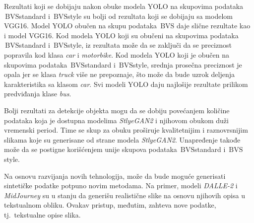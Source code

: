 \documentclass[12pt,oneside]{memoir}
\newcommand{\bvs}{\ensuremath{\,\textrm{BVS}}}
\begin{document}
Rezultati koji se dobijaju nakon obuke modela YOLO na skupovima podataka \bvs{standard} i \bvs{style} su bolji od rezultata koji se dobijaju sa modelom VGG16. Model YOLO obučen na skupu podataka \bvs{} daje slične rezultate kao i model VGG16. Kod modela YOLO koji su obučeni na skupovima podataka \bvs{standard} i \bvs{style}, iz rezultata može da se zaključi da se preciznost popravila kod klasa \textit{car} i \textit{motorbike}. Kod modela YOLO koji je obučen na skupovima podataka \bvs{standard} i \bvs{style}, srednja prosečna preciznost je opala jer se klasa \textit{truck} više ne prepoznaje, što može da bude uzrok deljenja karakteristika sa klasom \textit{car}. Svi modeli YOLO daju najlošije rezultate prilikom predviđanja klase \textit{bus}.


Bolji rezultati za detekcije objekta mogu da se dobiju povećanjem količine podataka koja je dostupna modelima \textit{StlyeGAN2} i njihovom obukom duži vremenski period. Time se skup za obuku proširuje kvalitetnijim i raznovrsnijim slikama koje su generisane od strane modela \textit{StlyeGAN2}.
Unapređenje takođe može da se postigne korišćenjem unije skupova podataka \bvs{standard} i \bvs{style}.


Na osnovu razvijanja novih tehnologija, može da bude moguće generisati sintetičke podatke potpuno novim metodama. Na primer, modeli \textit{DALLE-2} \cite{reddy2021dall} i \textit{MidJourney} \cite{midjourney2022} su u stanju da generišu realistične slike na osnovu njihovih opisa u tekstualnom obliku. Ovakav pristup, međutim, zahteva nove podatke, tj.~tekstualne opise slika.


\end{document}
